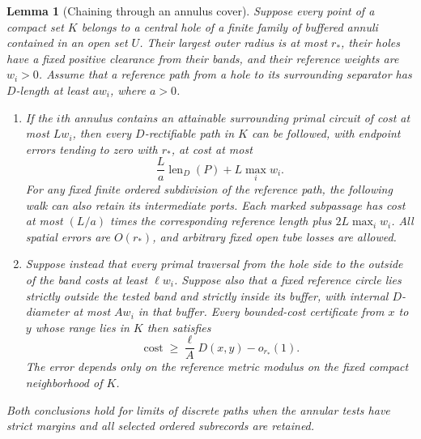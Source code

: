 \documentclass[11pt]{article}
\numberwithin{equation}{section}
\newtheorem{lemma}[theorem]{Lemma}
\theoremstyle{definition}
\theoremstyle{remark}
\newcommand{\1}{\mathbf 1}
\begin{document}
\begin{lemma}[Chaining through an annulus cover]
\label{met:chain}
Suppose every point of a compact set $K$ belongs to a central hole of a
finite family of buffered annuli contained in an open set $U$.  Their
largest outer radius is at most $r_*$, their holes have a fixed positive
clearance from their bands, and their reference weights are $w_i>0$.
Assume that a reference path from a hole to its surrounding separator
has $D$-length at least $a w_i$, where $a>0$.
\begin{enumerate}
\item If the $i$th annulus contains an attainable surrounding primal
circuit of cost at most $Lw_i$, then every $D$-rectifiable path in $K$
can be followed, with endpoint errors tending to zero with $r_*$, at
cost at most
\[
 \frac{L}{a}\operatorname{len}_D(P)+L\max_i w_i.
\]
For any fixed finite ordered subdivision of the reference path, the
following walk can also retain its intermediate ports.  Each marked
subpassage has cost at most $(L/a)$ times the corresponding reference
length plus $2L\max_iw_i$.  All spatial errors are $O(r_*)$, and
arbitrary fixed open tube losses are allowed.
\item Suppose instead that every primal traversal from the hole side
to the outside of the band costs at least $\ell w_i$.  Suppose also
that a fixed reference circle lies strictly outside the tested band
and strictly inside its buffer, with internal $D$-diameter at most
$Aw_i$ in that buffer.  Every bounded-cost
certificate from $x$ to $y$ whose range lies in $K$ then satisfies
\[
 \operatorname{cost}\geq \frac{\ell}{A}D(x,y)-o_{r_*}(1).
\]
The error depends only on the reference metric modulus on the fixed
compact neighborhood of $K$.
\end{enumerate}
Both conclusions hold for limits of discrete paths when the annular
tests have strict margins and all selected ordered subrecords are
retained.
\end{lemma}
\end{document}
